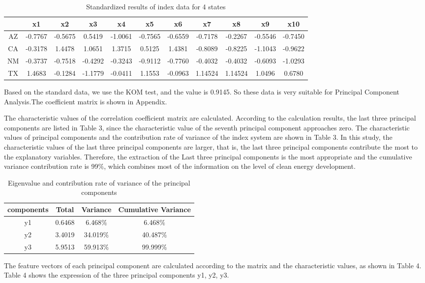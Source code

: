 \documentclass{mcmthesis}
\begin{document}
\begin{enumerate}
\begin{enumerate}
      \begin{table}
      \begin{tabular}{|c|c|c|c|c|c|c|c|c|c|c|}
      \hline
      { }&x1&x2&x3&x4&x5&x6&x7&x8&x9&x10\\
      \hline
      {AZ}&-0.7767&-0.5675&0.5419&-1.0061&-0.7565&-0.6559&-0.7178&-0.2267&-0.5546&-0.7450\\
      \hline
      {CA}&-0.3178&1.4478&1.0651&1.3715&0.5125&1.4381&-0.8089&-0.8225&-1.1043&-0.9622\\
      \hline
      {NM}&-0.3737&-0.7518&-0.4292&-0.3243&-0.9112&-0.7760&-0.4032&-0.4032&-0.6093&-1.0293\\
      \hline
      {TX}&1.4683&-0.1284&-1.1779&-0.0411&1.1553&-0.0963&1.14524&1.14524&1.0496&0.6780\\
      \hline
      \end{tabular}
      \caption{Standardized results of index data for 4 states}
      \end{table}
      Based on the standard data, we use the KOM test, and the value is 0.9145. So these data is very suitable for Principal Component Analysis.The coefficient matrix is shown in Appendix.

      The characteristic values of the correlation coefficient matrix are calculated. According to the calculation results, the last three principal components are listed in Table 3, since the characteristic value of the seventh principal component approaches zero. The characteristic values of principal components and the contribution rate of variance of the index system are shown in Table 3. In this study, the characteristic values of the last three principal components are larger, that is, the last three principal components contribute the most to the explanatory variables. Therefore, the extraction of the Last three principal components is the most appropriate and the cumulative variance contribution rate is 99$\%$, which combines most of the information on the level of clean energy development.
      \begin{table}
      \begin{tabular}{|c|c|c|c|}
      \hline
      { components }&{Total}&{Variance}&{Cumulative Variance}\\
      \hline
      {y1}&0.6468&6.468$\%$&6.468$\%$\\
      \hline
      {y2}&3.4019&34.019$\%$ & 40.487$\%$\\
      \hline
      {y3}&5.9513&59.913$\%$ & 99.999$\%$\\
      \hline
      \end{tabular}
      \caption{Eigenvalue and contribution rate of variance of the principal components}
      \end{table}
        The feature vectors of each principal component are calculated according to the matrix and the characteristic values, as shown in Table 4. Table 4 shows the expression of the three principal components y1, y2, y3.


\end{enumerate}
\end{enumerate}
\end{document}
